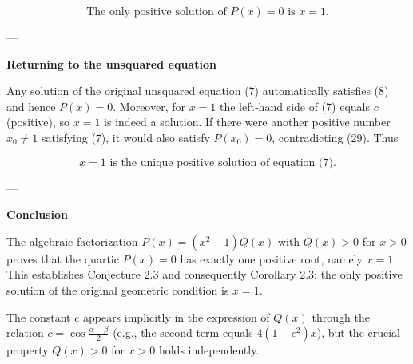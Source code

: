 \documentclass{article}
\begin{document}
\[
\text{The only positive solution of } P(x)=0 \text{ is } x=1. \tag{29}
\]  

---

\noindent\textbf{Returning to the unsquared equation}  

Any solution of the original unsquared equation (7) automatically satisfies (8) and hence \(P(x)=0\). Moreover, for \(x=1\) the left‑hand side of (7) equals \(c\) (positive), so \(x=1\) is indeed a solution. If there were another positive number \(x_{0}\neq1\) satisfying (7), it would also satisfy \(P(x_{0})=0\), contradicting (29). Thus  

\[
x=1 \text{ is the unique positive solution of equation (7)}. \tag{30}
\]  

---

\noindent\textbf{Conclusion}  

The algebraic factorization \(P(x)=(x^{2}-1)Q(x)\) with \(Q(x)>0\) for \(x>0\) proves that the quartic \(P(x)=0\) has exactly one positive root, namely \(x=1\). This establishes Conjecture 2.3 and consequently Corollary 2.3: the only positive solution of the original geometric condition is \(x=1\).  

The constant \(c\) appears implicitly in the expression of \(Q(x)\) through the relation \(c=\cos\frac{\alpha-\beta}{2}\) (e.g., the second term equals \(4(1-c^{2})x\)), but the crucial property \(Q(x)>0\) for \(x>0\) holds independently.
\end{document}
